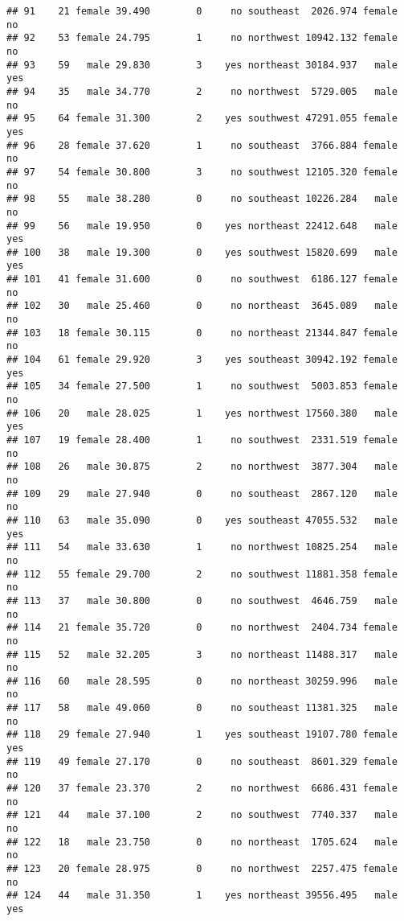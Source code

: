 \documentclass[
]{article}
\begin{document}
\begin{verbatim}
## 91    21 female 39.490        0     no southeast  2026.974 female       no
## 92    53 female 24.795        1     no northwest 10942.132 female       no
## 93    59   male 29.830        3    yes northeast 30184.937   male      yes
## 94    35   male 34.770        2     no northwest  5729.005   male       no
## 95    64 female 31.300        2    yes southwest 47291.055 female      yes
## 96    28 female 37.620        1     no southeast  3766.884 female       no
## 97    54 female 30.800        3     no southwest 12105.320 female       no
## 98    55   male 38.280        0     no southeast 10226.284   male       no
## 99    56   male 19.950        0    yes northeast 22412.648   male      yes
## 100   38   male 19.300        0    yes southwest 15820.699   male      yes
## 101   41 female 31.600        0     no southwest  6186.127 female       no
## 102   30   male 25.460        0     no northeast  3645.089   male       no
## 103   18 female 30.115        0     no northeast 21344.847 female       no
## 104   61 female 29.920        3    yes southeast 30942.192 female      yes
## 105   34 female 27.500        1     no southwest  5003.853 female       no
## 106   20   male 28.025        1    yes northwest 17560.380   male      yes
## 107   19 female 28.400        1     no southwest  2331.519 female       no
## 108   26   male 30.875        2     no northwest  3877.304   male       no
## 109   29   male 27.940        0     no southeast  2867.120   male       no
## 110   63   male 35.090        0    yes southeast 47055.532   male      yes
## 111   54   male 33.630        1     no northwest 10825.254   male       no
## 112   55 female 29.700        2     no southwest 11881.358 female       no
## 113   37   male 30.800        0     no southwest  4646.759   male       no
## 114   21 female 35.720        0     no northwest  2404.734 female       no
## 115   52   male 32.205        3     no northeast 11488.317   male       no
## 116   60   male 28.595        0     no northeast 30259.996   male       no
## 117   58   male 49.060        0     no southeast 11381.325   male       no
## 118   29 female 27.940        1    yes southeast 19107.780 female      yes
## 119   49 female 27.170        0     no southeast  8601.329 female       no
## 120   37 female 23.370        2     no northwest  6686.431 female       no
## 121   44   male 37.100        2     no southwest  7740.337   male       no
## 122   18   male 23.750        0     no northeast  1705.624   male       no
## 123   20 female 28.975        0     no northwest  2257.475 female       no
## 124   44   male 31.350        1    yes northeast 39556.495   male      yes

\end{verbatim}
\end{document}
